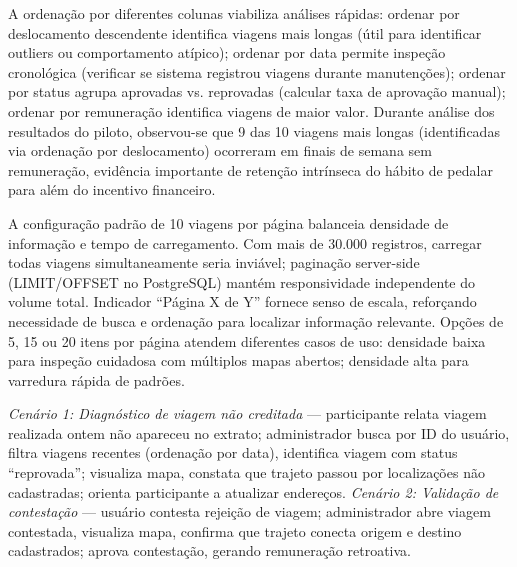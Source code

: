 A ordenação por diferentes colunas viabiliza análises rápidas: ordenar por deslocamento descendente identifica viagens mais longas (útil para identificar outliers ou comportamento atípico); ordenar por data permite inspeção cronológica (verificar se sistema registrou viagens durante manutenções); ordenar por status agrupa aprovadas vs. reprovadas (calcular taxa de aprovação manual); ordenar por remuneração identifica viagens de maior valor. Durante análise dos resultados do piloto, observou-se que 9 das 10 viagens mais longas (identificadas via ordenação por deslocamento) ocorreram em finais de semana sem remuneração, evidência importante de retenção intrínseca do hábito de pedalar para além do incentivo financeiro.

A configuração padrão de 10 viagens por página balanceia densidade de informação e tempo de carregamento. Com mais de 30.000 registros, carregar todas viagens simultaneamente seria inviável; paginação server-side (LIMIT/OFFSET no PostgreSQL) mantém responsividade independente do volume total. Indicador ``Página X de Y'' fornece senso de escala, reforçando necessidade de busca e ordenação para localizar informação relevante. Opções de 5, 15 ou 20 itens por página atendem diferentes casos de uso: densidade baixa para inspeção cuidadosa com múltiplos mapas abertos; densidade alta para varredura rápida de padrões.

\textit{Cenário 1: Diagnóstico de viagem não creditada} --- participante relata viagem realizada ontem não apareceu no extrato; administrador busca por ID do usuário, filtra viagens recentes (ordenação por data), identifica viagem com status ``reprovada''; visualiza mapa, constata que trajeto passou por localizações não cadastradas; orienta participante a atualizar endereços. \textit{Cenário 2: Validação de contestação} --- usuário contesta rejeição de viagem; administrador abre viagem contestada, visualiza mapa, confirma que trajeto conecta origem e destino cadastrados; aprova contestação, gerando remuneração retroativa.


